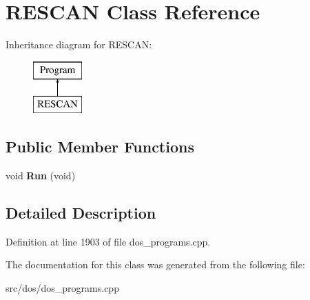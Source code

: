 \hypertarget{classRESCAN}{\section{R\-E\-S\-C\-A\-N Class Reference}
\label{classRESCAN}
}
Inheritance diagram for R\-E\-S\-C\-A\-N\-:\begin{figure}[H]
\begin{center}
\leavevmode
\includegraphics[height=2.000000cm]{classRESCAN}
\end{center}
\end{figure}
\subsection*{Public Member Functions}
\begin{DoxyCompactItemize}
\item 
\hypertarget{classRESCAN_af3bea53bb1105100a4703c239c701df6}{void {\bfseries Run} (void)}\label{classRESCAN_af3bea53bb1105100a4703c239c701df6}

\end{DoxyCompactItemize}


\subsection{Detailed Description}


Definition at line 1903 of file dos\-\_\-programs.\-cpp.



The documentation for this class was generated from the following file\-:\begin{DoxyCompactItemize}
\item 
src/dos/dos\-\_\-programs.\-cpp\end{DoxyCompactItemize}
